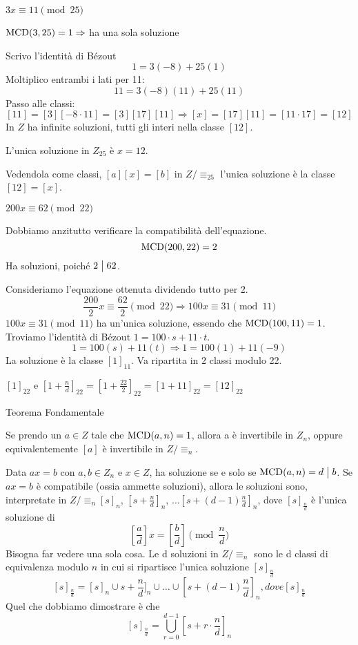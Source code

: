 \begin{exmp}
$3x \equiv 11 \pmod{25}$

$\operatorname{MCD}(3, 25) = 1 \Rightarrow$ ha una sola soluzione

Scrivo l'identit\`a di B\'ezout
\[
1 = 3 (-8) + 25 (1)
\]
Moltiplico entrambi i lati per 11:
\[
11 = 3 (-8) (11) + 25 (11)
\]
Passo alle classi:
\[
[11] = [3] [-8 \cdot 11] = [3] [17] [11] \Rightarrow [x] = [17] [11] = [11 \cdot 17] = [12]
\]
In $Z$ ha infinite soluzioni, tutti gli interi nella classe $[12]$.

L'unica soluzione in $Z_{25}$ \`e $x = 12$.

Vedendola come classi, $[a] [x] = [b]$ in $Z / \equiv_{25}$ l'unica soluzione \`e la classe $[12] = [x]$.
\end{exmp}

\begin{exmp}
$200 x \equiv 62 \pmod{22}$

Dobbiamo anzitutto verificare la compatibilit\`a dell'equazione.
\[
\operatorname{MCD}(200, 22) = 2
\]
Ha soluzioni, poich\'e $2 \bigm| 62$.

Consideriamo l'equazione ottenuta dividendo tutto per 2.
\[
\frac{200}{2} x \equiv \frac{62}{2} \pmod{22} \Rightarrow 100 x \equiv 31 \pmod{11}
\]
$100 x \equiv 31 \pmod{11}$ ha un'unica soluzione, essendo che $\operatorname{MCD}(100, 11) = 1$. Troviamo l'identit\`a di B\'ezout $1 = 100 \cdot s + 11 \cdot t$.
\[
1 = 100 (s) + 11 (t) \Rightarrow 1 = 100 (1) + 11 (-9)
\]
La soluzione \`e la classe $[1]_{11}$. Va ripartita in 2 classi modulo 22.

$[1]_{22}$ e $[1 + \frac{n}{d}]_{22} = [1 + \frac{22}{2}]_{22} = [1 + 11]_{22} = [12]_{22} $
\end{exmp}

Teorema Fondamentale

Se prendo un $a \in Z$ tale che $\operatorname{MCD}(a, n) = 1$, allora a \`e invertibile in $Z_n$, oppure equivalentemente $[a]$ \`e invertibile in $Z / \equiv_n$.

Data $a x = b$ con $a, b \in Z_n$ e $x \in Z$, ha soluzione se e solo se $\operatorname{MCD}(a, n) = d \bigm| b$. Se $a x = b$ \`e compatibile (ossia ammette soluzioni), allora le soluzioni sono, interpretate in $Z / \equiv_n [s]_n$, $[s + \frac{n}{d}]_n$, $\dots [s + (d - 1) \frac{n}{d}]_n$, dove $[s]_{\frac{n}{d}}$ \`e l'unica soluzione di
\[
[\frac{a}{d}] x = [\frac{b}{d}] \pmod{\frac{n}{d}}
\]
Bisogna far vedere una sola cosa. Le d soluzioni in $Z / \equiv_{n}$ sono le d classi di equivalenza modulo $n$ in cui si ripartisce l'unica soluzione $[s]_{\frac{n}{d}}$
\[
[s]_{\frac{n}{d}} = [s]_n \cup s + \frac{n}{d}]_n \cup \dots \cup [s + (d - 1) \frac{n}{d}]_n, dove [s]_{\frac{n}{d}}
\]
Quel che dobbiamo dimostrare \`e che
\[
[s]_{\frac{n}{d}} = \bigcup_{r = 0}^{d-1} [s + r \cdot \frac{n}{d}]_n
\]

